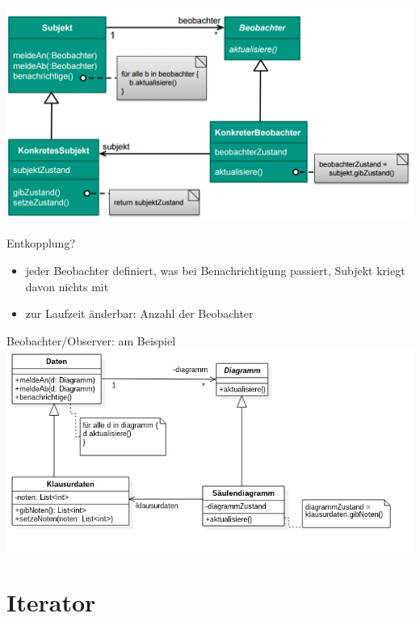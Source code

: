 \documentclass[18pt]{beamer}
\begin{document}
	\begin{frame}{}
		\includegraphics[keepaspectratio, width=\textwidth, height=\textheight]{pics/tut3/obs.png}
		\pause
		\begin{block}{Entkopplung?}
		\begin{itemize}
			\pause 
			\item jeder Beobachter definiert, was bei Benachrichtigung passiert, Subjekt kriegt davon nichts mit \pause
			\item zur Laufzeit änderbar: Anzahl der Beobachter
		\end{itemize}
		\end{block}
	\end{frame}

	\begin{frame}{Beobachter/Observer: am Beispiel}
		\includegraphics[keepaspectratio, width=\textwidth, height=\textheight]{pics/tut3/observer_example.jpg}
	\end{frame}

\section{Iterator}
\end{document}
